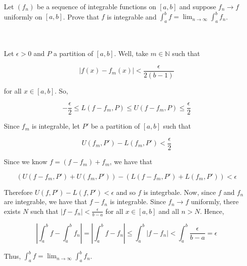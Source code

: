 Let $(f_n)$ be a sequence of integrable functions on $[a,b]$ and suppose $f_n\rightarrow f$ uniformly on
$[a,b]$. Prove that $f$ is integrable and $\int_a^bf=\lim_{n\rightarrow\infty}\int_a^bf_n$.\\\\

\begin{solution}\renewcommand{\qedsymbol}{}\ \\
    Let $\epsilon>0$ and $P$ a partition of $[a,b]$. Well, take $m\in\mathbb{N}$ such that
    
    $$|f(x)-f_m(x)|<\frac{\epsilon}{2(b-1)}$$
    
    for all $x\in[a,b]$. So,
    
    $$-\frac{\epsilon}{2}\leq L(f-f_m,P)\leq U(f-f_m,P)\leq\frac{\epsilon}{2}$$
    
    Since $f_m$ is integrable, let $P'$ be a partition of $[a,b]$ such that
    
    $$U(f_m,P')-L(f_m,P')<\frac{\epsilon}{2}$$
    
    Since we know $f=(f-f_m)+f_m$, we have that
    
    $$(U(f-f_m,P')+U(f_m,P'))-(L(f-f_m,P')+L(f_m,P'))<\epsilon$$
    
    Therefore $U(f,P')-L(f,P')<\epsilon$ and so $f$ is integrbale. Now, since $f$ and $f_n$ are
    integrable, we have that $f-f_n$ is integrable. Since $f_n\rightarrow f$ uniformly, there exists $N$
    such that $|f-f_n|<\frac{\epsilon}{b-a}$ for all $x\in[a,b]$ and all $n>N$. Hence,
    
    $$|\int_a^bf-\int_a^bf_n|=|\int_a^bf-f_n|\leq\int_a^b|f-f_n|<\int_a^b\frac{\epsilon}{b-a}=\epsilon$$
    
    Thus, $\int_a^bf=\lim_{n\rightarrow\infty}\int_a^bf_n$.

\end{solution}